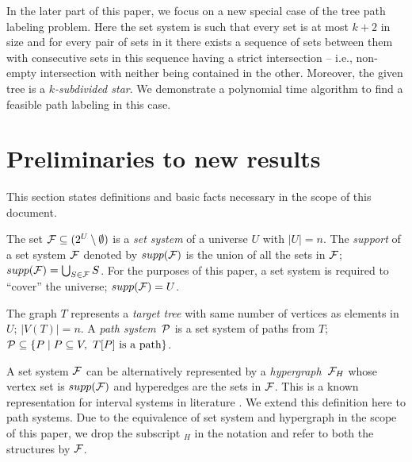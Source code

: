 \documentclass[MS]             %
              {iitmdiss_as}    %
\begin{document}
In the later part of this paper, we focus on a new special case of the
tree path labeling problem. Here the set system is such that every set
is at most $k+2$ in size and for every pair of sets in it there exists
a sequence of sets between them with consecutive sets in this sequence
having a strict intersection -- i.e., non-empty intersection with
neither being contained in the other. Moreover, the given tree is a
{\em $k$-subdivided star}. We demonstrate a polynomial time algorithm
to find a feasible path labeling in this case.


\section{Preliminaries to new results}
\label{ch:prelims} 

This
section states definitions and basic facts necessary in the scope of
this document.


The set ${\mathcal F} \subseteq (2^{U} \setminus \emptyset)$ is a {\em set
  system} of a universe $U$ with $|U| = n$.  The {\em support} of a
set system ${\mathcal F}$ denoted by $supp({\cal F})$ is the union of all the sets in
${\mathcal F}$; $supp({\mathcal F}) = \bigcup_{S \in {\mathcal F}}S$. For the purposes of this
paper, a set system is required to ``cover'' the universe; $
supp({\cal F}) = U$.

The graph $T$ represents a {\em target tree} with same
number of vertices as elements in $U$; $|V(T)| = n$.  A {\em path
  system}\, ${\cal P}$ is a set system of paths from $T$; ${\cal P} \subseteq \{P
\mid P \subseteq V, \text{ } T[P] \text{ is a path} \}$.

% 

A set system ${\cal F}$ can be alternatively represented by a {\em
  hypergraph}\, ${\cal F}_H$ whose vertex set is $supp({\cal F})$ and hyperedges
are the sets in ${\cal F}$. This is a known representation for interval
systems in literature \cite{bls99,kklv10}.  We extend this definition
here to path systems. Due to the equivalence of set system and
hypergraph in the scope of this paper, we drop the subscript $_H$ in
the notation and refer to both the structures by ${\cal F}$.
\end{document}
